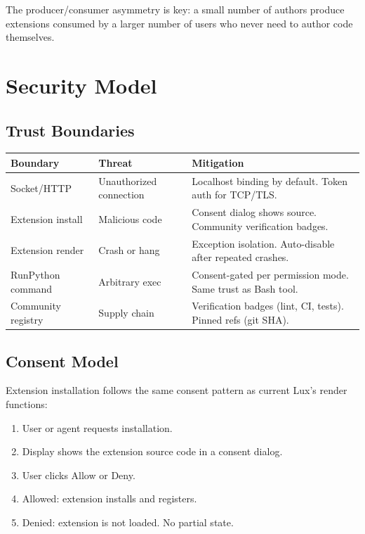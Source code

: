 \documentclass[a4paper,10pt]{article}
\begin{document}
The producer/consumer asymmetry is key: a small number of authors
produce extensions consumed by a larger number of users who never
need to author code themselves.

\section{Security Model}

\subsection{Trust Boundaries}

\begin{center}
\begin{tabular}{@{}lp{4cm}p{5cm}@{}}
\toprule
\textbf{Boundary} & \textbf{Threat} & \textbf{Mitigation} \\
\midrule
Socket/HTTP & Unauthorized connection & Localhost binding by
  default.  Token auth for TCP/TLS. \\
Extension install & Malicious code & Consent dialog shows source.
  Community verification badges. \\
Extension render & Crash or hang & Exception isolation.  Auto-disable
  after repeated crashes. \\
RunPython command & Arbitrary exec & Consent-gated per permission
  mode.  Same trust as Bash tool. \\
Community registry & Supply chain & Verification badges (lint, CI,
  tests).  Pinned refs (git SHA). \\
\bottomrule
\end{tabular}
\end{center}

\subsection{Consent Model}

Extension installation follows the same consent pattern as current
Lux's render functions:

\begin{enumerate}[nosep]
  \item User or agent requests installation.
  \item Display shows the extension source code in a consent dialog.
  \item User clicks Allow or Deny.
  \item Allowed: extension installs and registers.
  \item Denied: extension is not loaded.  No partial state.
\end{enumerate}
\end{document}
